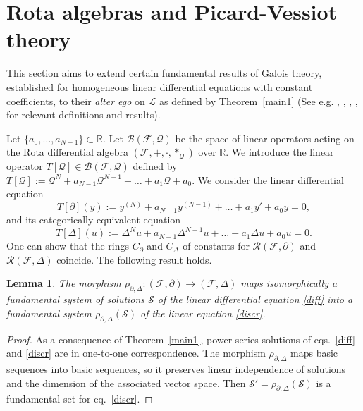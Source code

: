 \documentclass[10pt]{amsart}
\numberwithin{equation}{section}
\newtheorem{lemma}{Lemma}
\theoremstyle{definition}
\begin{document}
\section{Rota algebras and  Picard-Vessiot theory}
\label{sec:7}

This section aims to extend certain fundamental results of Galois theory,
established for homogeneous linear differential equations with constant
coefficients, to their \textit{alter ego} on $\mathcal{L}$ as defined by
Theorem~\ref{main1} (See e.g. \cite{Franke}, \cite{Kolchin}, \cite{PS1997}, \cite{PS2003}, \cite{Serre}  for relevant
definitions and results).

Let $\{a_{0},\ldots ,a_{N-1}\}\subset \mathbb{R}$. Let
$\mathcal{B(\mathcal{F}, \mathcal{Q})}$ be the space of linear operators
acting on the Rota differential algebra
$(\mathcal{F},+, \cdot , *_{\mathcal{Q}})$ over $\mathbb{R}$. We introduce
the linear operator
$T[\mathcal{Q}]\in \mathcal{B(\mathcal{F}, \mathcal{Q})}$ defined by
$T[\mathcal{Q}]:= \mathcal{Q}^{N}+a_{N-1} \mathcal{Q}^{N-1}+\ldots +a_{1}
\mathcal{Q}+a_{0}$. We consider the linear differential equation
\begin{equation}
T[{\partial}](y):= y^{(N)}+a_{N-1} y^{(N-1)}+\ldots +a_{1}y'+a_{0} y =0,
\label{diff}
\end{equation}
and its categorically equivalent equation
\begin{equation}
T[{\Delta}](u):=\Delta ^{N}u+a_{N-1} \Delta ^{N-1}u+\ldots +a_{1}
\Delta u +a_{0} u=0.
\label{discr}
\end{equation}
One can show that the rings $C_{\partial}$ and $C_{\Delta}$ of constants for $\mathcal{R}(\mathcal{F}, \partial)$ and $\mathcal{R}(\mathcal{F}, \Delta)$  coincide.
 The following result holds.
\begin{lemma}
\label{fundamental}
The morphism
$\rho _{\partial ,\Delta}: (\mathcal{F}, \mathcal{\partial})
\longrightarrow (\mathcal{F}, \Delta )$ maps isomorphically a fundamental
system of solutions $\mathcal{S}$ of the linear differential equation \eqref{diff} into a fundamental system
$\rho _{\partial , \Delta}(\mathcal{S})$ of the linear  equation \eqref{discr}.
\end{lemma}
\begin{proof}
As a consequence of Theorem~\ref{main1}, power series solutions of eqs.~\eqref{diff}
and \eqref{discr} are in one-to-one correspondence. The morphism
$\rho _{\partial ,\Delta}$ maps basic sequences into basic sequences, so
it preserves linear independence of solutions and the dimension of the
associated vector space. Then
$\mathcal{S}'=\rho _{\partial , \Delta}(\mathcal{S})$ is a fundamental
set for eq.~\eqref{discr}.
\end{proof}
\end{document}
